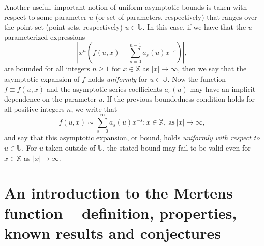 \documentclass[11pt,reqno,a4letter]{article}
\numberwithin{figure}{section}
\numberwithin{table}{section}
\theoremstyle{plain}
\numberwithin{theorem}{section}
\theoremstyle{definition}
\begin{document}
Another useful, important notion of uniform asymptotic bounds is taken with respect to some parameter $u$ 
(or set of parameters, respectively) that ranges over the point set (point sets, respectively) 
$u \in \mathbb{U}$. In this case, if we have that the $u$-parameterized expressions 
\[
\left\lvert x^n\left(f(u, x) - \sum_{s=0}^{n-1} a_s(u) x^{-s}\right) \right\rvert, 
\]
are bounded for all integers $n \geq 1$ for $x \in \mathbb{X}$ as $|x| \rightarrow \infty$, then we say that 
the asymptotic expansion of $f$ holds \emph{uniformly} for $u \in \mathbb{U}$. 
Now the function $f \equiv f(u, x)$ and the 
asymptotic series coefficients $a_s(u)$ may have an implicit dependence on the parameter $u$. 
If the previous boundedness condition holds for all positive integers $n$, we write that 
\[
f(u, x) \sim \sum_{s=0}^{\infty} a_s(u) x^{-s}; x \in \mathbb{X}, \mathrm{\ as \ } |x| \rightarrow \infty, 
\]
and say that this asymptotic expansion, or bound, holds \emph{uniformly with respect to $u \in \mathbb{U}$}. 
For $u$ taken outside of $\mathbb{U}$, the stated bound may fail to be valid even for $x \in \mathbb{X}$ as 
$|x| \rightarrow \infty$. 

\newpage
\section{An introduction to the Mertens function -- definition, properties, known results and conjectures} 
\label{subSection_MertensMxClassical_Intro} 
\end{document}

